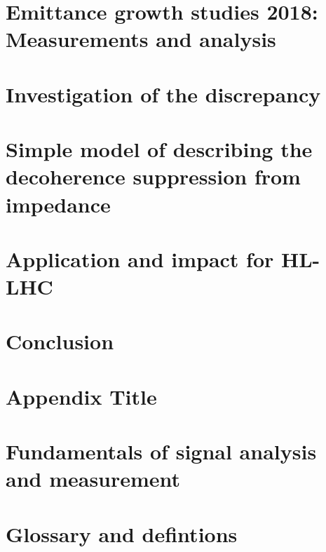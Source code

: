\documentclass[12pt,twoside]{report} %
\begin{document}
%

\chapter{Emittance growth studies 2018: Measurements and analysis}\label{Ch:2018_analyisis}


\chapter{Investigation of the discrepancy}


\chapter{Simple model of describing the decoherence suppression from impedance}


\chapter{Application and impact for HL-LHC}


\chapter{Conclusion}


\printglossaries
\appendix
\chapter{Appendix Title}

\chapter{Fundamentals of signal analysis and measurement}

\chapter{Glossary and defintions}


\backmatter
\printbibliography
{}
\end{document}
